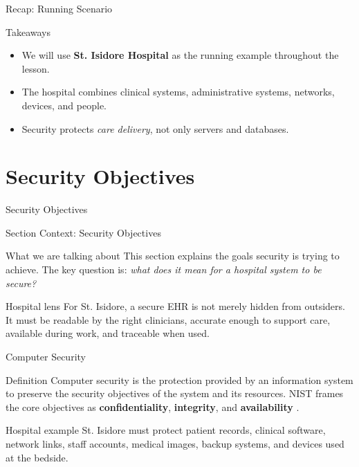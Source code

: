 \documentclass[presentation]{beamer}
\newcommand{\sectiontitleframe}[1]{
\begin{frame}[plain,c]
\begin{center}
{\usebeamerfont{title}\usebeamercolor[fg]{title}#1}
\end{center}
\end{frame}
}
\begin{document}
\begin{frame}[c]{Recap: Running Scenario}
\begin{block}{Takeaways}
\begin{itemize}
    \item We will use \textbf{St. Isidore Hospital} as the running example throughout the lesson.
    \item The hospital combines clinical systems, administrative systems, networks, devices, and people.
    \item Security protects \textit{care delivery}, not only servers and databases.
\end{itemize}
\end{block}
\end{frame}

\section{Security Objectives}
\sectiontitleframe{Security Objectives}

\begin{frame}[c]{Section Context: Security Objectives}
\begin{block}{What we are talking about}
This section explains the goals security is trying to achieve. The key question is:
\textit{what does it mean for a hospital system to be secure?}
\end{block}

\begin{exampleblock}{Hospital lens}
For St. Isidore, a secure EHR is not merely hidden from outsiders. It must be readable by the
right clinicians, accurate enough to support care, available during work, and traceable when used.
\end{exampleblock}
\end{frame}

\begin{frame}[c]{Computer Security}
\begin{block}{Definition}
Computer security is the protection provided by an information system to preserve the security
objectives of the system and its resources. NIST frames the core objectives as
\textbf{confidentiality}, \textbf{integrity}, and \textbf{availability} \cite{nist_fips_199}.
\end{block}

\begin{exampleblock}{Hospital example}
St. Isidore must protect patient records, clinical software, network links, staff accounts,
medical images, backup systems, and devices used at the bedside.
\end{exampleblock}
\end{frame}
\end{document}
